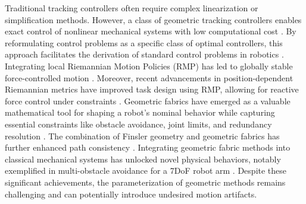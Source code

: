 Traditional tracking controllers often require complex linearization or simplification methods. However, a class of geometric tracking controllers enables exact control of nonlinear mechanical systems with low computational cost \cite{udwadia2003new}. By reformulating control problems as a specific class of optimal controllers, this approach facilitates the derivation of standard control problems in robotics \cite{peters2008unifying}.
Integrating local Riemannian Motion Policies (RMP) has led to globally stable force-controlled motion \cite{cheng2020rmp}. Moreover, recent advancements in position-dependent Riemannian metrics have improved task design using RMP, allowing for reactive force control under constraints \cite{bylard2021composable}.
Geometric fabrics have emerged as a valuable mathematical tool for shaping a robot's nominal behavior while capturing essential constraints like obstacle avoidance, joint limits, and redundancy resolution \cite{xie2020geometric}. The combination of Finsler geometry and geometric fabrics has further enhanced path consistency \cite{ratliff2021generalized}.
Integrating geometric fabric methods into classical mechanical systems has unlocked novel physical behaviors, notably exemplified in multi-obstacle avoidance for a 7DoF robot arm \cite{van2022geometric}. Despite these significant achievements, the parameterization of geometric methods remains challenging and can potentially introduce undesired motion artifacts.


